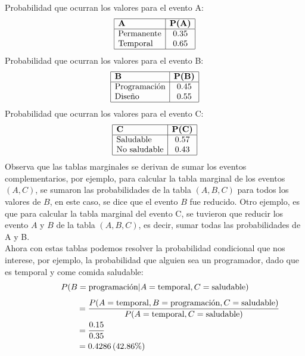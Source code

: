 \documentclass{article}
\begin{document}
Probabilidad que ocurran los valores para el evento A:
\[
\begin{array}{|l|c|}
\hline
\textbf{A} & \textbf{P(A)} \\
\hline
\text{Permanente} & 0.35 \\
\text{Temporal} & 0.65 \\
\hline
\end{array}
\]
Probabilidad que ocurran los valores para el evento B:
\[
\begin{array}{|l|c|}
\hline
\textbf{B} & \textbf{P(B)} \\
\hline
\text{Programación} & 0.45 \\
\text{Diseño} & 0.55 \\
\hline
\end{array}
\]
Probabilidad que ocurran los valores para el evento C:
\[
\begin{array}{|l|c|}
\hline
\textbf{C} & \textbf{P(C)} \\
\hline
\text{Saludable} & 0.57 \\
\text{No saludable} & 0.43 \\
\hline
\end{array}
\]
Observa que las tablas marginales se derivan de sumar los eventos complementarios, por ejemplo, para calcular la tabla marginal de los eventos $(A, C)$, se sumaron las probabilidades de la tabla $(A,B,C)$ para todos los valores de $B$, en este caso, se dice que el evento $B$ fue reducido. Otro ejemplo, es que para calcular la tabla marginal del evento C, se tuvieron que reducir los evento $A$ y $B$ de la tabla $(A,B,C)$, es decir, sumar todas las probabilidades de A y B.
\\[12pt]
Ahora con estas tablas podemos resolver la probabilidad condicional que nos interese, por ejemplo, la probabilidad que alguien sea un programador, dado que es temporal y come comida saludable:
\begin{equation*}
    P(B=\text{programación}|A=\text{temporal},C=\text{saludable}) \\
\end{equation*}
\begin{equation*}
    \hspace*{2cm}
    \begin{aligned}
        &= \frac{P(A=\text{temporal},B=\text{programación},C=\text{saludable})}{P(A=\text{temporal},C=\text{saludable})} \\
        &= \frac{0.15}{0.35} \\
        &= 0.4286 \, (42.86\%)
    \end{aligned}
\end{equation*}
\end{document}
